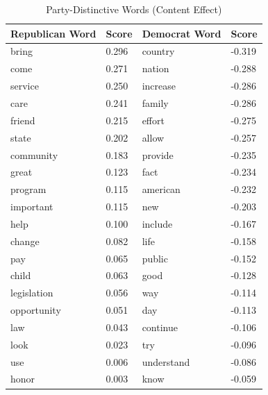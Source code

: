 \begin{table}[htbp]
\centering
\caption{Party-Distinctive Words (Content Effect)}
\begin{tabular}{llll}
\toprule
Republican Word & Score & Democrat Word & Score \\
\midrule
bring & 0.296 & country & -0.319 \\
come & 0.271 & nation & -0.288 \\
service & 0.250 & increase & -0.286 \\
care & 0.241 & family & -0.286 \\
friend & 0.215 & effort & -0.275 \\
state & 0.202 & allow & -0.257 \\
community & 0.183 & provide & -0.235 \\
great & 0.123 & fact & -0.234 \\
program & 0.115 & american & -0.232 \\
important & 0.115 & new & -0.203 \\
help & 0.100 & include & -0.167 \\
change & 0.082 & life & -0.158 \\
pay & 0.065 & public & -0.152 \\
child & 0.063 & good & -0.128 \\
legislation & 0.056 & way & -0.114 \\
opportunity & 0.051 & day & -0.113 \\
law & 0.043 & continue & -0.106 \\
look & 0.023 & try & -0.096 \\
use & 0.006 & understand & -0.086 \\
honor & 0.003 & know & -0.059 \\
\bottomrule
\end{tabular}
\end{table}
